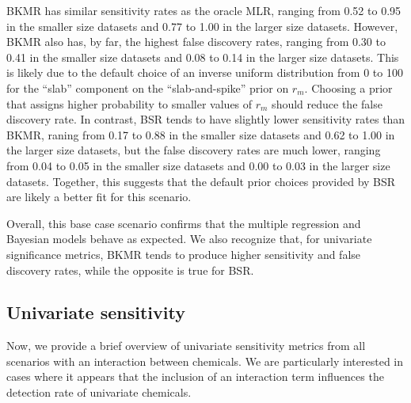 \documentclass[12pt, twoside]{amherstthesis}
\begin{document}
BKMR has similar sensitivity rates as the oracle MLR, ranging from 0.52 to 0.95 in the smaller size datasets and 0.77 to 1.00 in the larger size datasets. However, BKMR also has, by far, the highest false discovery rates, ranging from 0.30 to 0.41 in the smaller size datasets and 0.08 to 0.14 in the larger size datasets. This is likely due to the default choice of an inverse uniform distribution from 0 to 100 for the ``slab'' component on the ``slab-and-spike'' prior on \(r_m\). Choosing a prior that assigns higher probability to smaller values of \(r_m\) should reduce the false discovery rate. In contrast, BSR tends to have slightly lower sensitivity rates than BKMR, raning from 0.17 to 0.88 in the smaller size datasets and 0.62 to 1.00 in the larger size datasets, but the false discovery rates are much lower, ranging from 0.04 to 0.05 in the smaller size datasets and 0.00 to 0.03 in the larger size datasets. Together, this suggests that the default prior choices provided by BSR are likely a better fit for this scenario.

Overall, this base case scenario confirms that the multiple regression and Bayesian models behave as expected. We also recognize that, for univariate significance metrics, BKMR tends to produce higher sensitivity and false discovery rates, while the opposite is true for BSR.

\hypertarget{univsenschap}{%
\subsection{Univariate sensitivity}\label{univsenschap}}

Now, we provide a brief overview of univariate sensitivity metrics from all scenarios with an interaction between chemicals. We are particularly interested in cases where it appears that the inclusion of an interaction term influences the detection rate of univariate chemicals.
\end{document}
